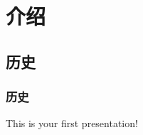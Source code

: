 \documentclass{beamer}
\begin{document}
{\section{介绍}
    \subsection{历史}
    \begin{frame} \frametitle{历史}
        This is your first presentation!
    \end{frame}



} %
\end{document}
